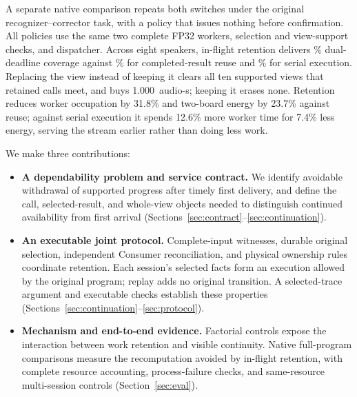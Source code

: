A separate native comparison repeats both switches under the original
recognizer--corrector task, with a policy that issues nothing before
confirmation. All policies use the same two complete FP32 workers,
selection and view-support checks, and dispatcher. Across eight speakers,
in-flight retention delivers \NativeFullCreditPct\% dual-deadline
coverage against \NativeReadyCreditPct\% for completed-result reuse and
\NativeConsCreditPct\% for serial execution. Replacing the view instead
of keeping it clears all ten supported views that retained calls meet,
and buys 1.000~audio-s; keeping it erases none. Retention reduces
worker occupation by 31.8\% and two-board energy by 23.7\% against reuse;
against serial execution it spends 12.6\% more worker time for 7.4\%
less energy, serving the stream earlier rather than doing less work.

We make three contributions:
\begin{itemize}
\item \textbf{A dependability problem and service contract.} We identify
  avoidable withdrawal of supported progress after timely first
  delivery, and define the call, selected-result, and whole-view
  objects needed to distinguish continued availability from first
  arrival (Sections~\ref{sec:contract}--\ref{sec:continuation}).
\item \textbf{An executable joint protocol.} Complete-input witnesses,
  durable original selection, independent Consumer reconciliation,
  and physical ownership rules coordinate retention. Each session's
  selected facts form an execution allowed by the original program;
  replay adds no original transition. A selected-trace argument and
  executable checks establish these properties
  (Sections~\ref{sec:continuation}--\ref{sec:protocol}).
\item \textbf{Mechanism and end-to-end evidence.} Factorial controls
  expose the interaction between work retention and visible
  continuity. Native full-program comparisons measure the
  recomputation avoided by in-flight retention, with complete resource
  accounting, process-failure checks, and same-resource multi-session
  controls (Section~\ref{sec:eval}).
\end{itemize}
